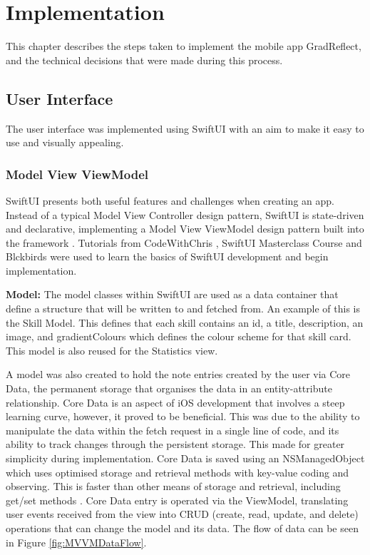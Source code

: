 \documentclass{l4proj}
\begin{document}
\chapter{Implementation} \label{implementation}

This chapter describes the steps taken to implement the mobile app GradReflect, and the technical decisions that were made during this process.

\section{User Interface}

The user interface was implemented using SwiftUI with an aim to make it easy to use and visually appealing. 

\subsection{Model View ViewModel}

SwiftUI presents both useful features and challenges when creating an app. Instead of a typical Model View Controller design pattern, SwiftUI is state-driven and declarative, implementing a Model View ViewModel design pattern built into the framework \citep{naumov_swiftui_architecture_2019}. Tutorials from CodeWithChris \citep{ching_codewithchris_2021}, SwiftUI Masterclass Course \citep{petras_swiftui_2021} and Blckbirds \citep{blckbirds_learn_2021} were used to learn the basics of SwiftUI development and begin implementation.

\textbf{Model:} The model classes within SwiftUI are used as a data container that define a structure that will be written to and fetched from. An example of this is the Skill Model. This defines that each skill contains an id, a title, description, an image, and gradientColours which defines the colour scheme for that skill card. This model is also reused for the Statistics view.

A model was also created to hold the note entries created by the user via Core Data, the permanent storage that organises the data in an entity-attribute relationship. Core Data is an aspect of iOS development that involves a steep learning curve, however, it proved to be beneficial. This was due to the ability to manipulate the data within the fetch request in a single line of code, and its ability to track changes through the persistent storage. This made for greater simplicity during implementation. Core Data is saved using an NSManagedObject which uses optimised storage and retrieval methods with key-value coding and observing. This is faster than other means of storage and retrieval, including get/set methods \citep{apple_developer_documentation_core_2021}. Core Data entry is operated via the ViewModel, translating user events received from the view into CRUD (create, read, update, and delete) operations that can change the model and its data. The flow of data can be seen in Figure \ref{fig:MVVMDataFlow}. 
\end{document}
